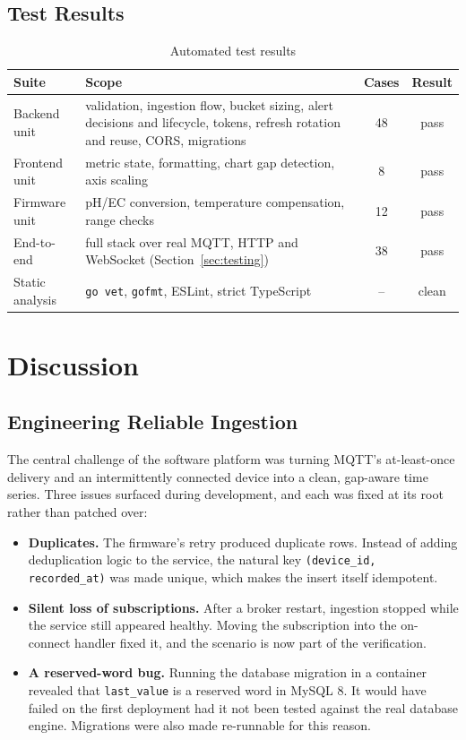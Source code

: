 \documentclass[11pt,a4paper,oneside]{report}
\newcommand{\code}[1]{\texttt{#1}}
\begin{document}
\section{Test Results}
\begin{table}[htbp]
\centering
\caption{Automated test results}
\label{tab:tests}
\small
\begin{tabularx}{\linewidth}{@{}l X c c@{}}
\toprule
\textbf{Suite} & \textbf{Scope} & \textbf{Cases} & \textbf{Result} \\
\midrule
Backend unit       & validation, ingestion flow, bucket sizing, alert decisions and lifecycle, tokens, refresh rotation and reuse, CORS, migrations & 48 & pass \\
Frontend unit      & metric state, formatting, chart gap detection, axis scaling & 8 & pass \\
Firmware unit      & pH/EC conversion, temperature compensation, range checks & 12 & pass \\
End-to-end         & full stack over real MQTT, HTTP and WebSocket (Section~\ref{sec:testing}) & 38 & pass \\
Static analysis    & \code{go vet}, \code{gofmt}, ESLint, strict TypeScript & -- & clean \\
\bottomrule
\end{tabularx}
\end{table}

\chapter{Discussion}

\section{Engineering Reliable Ingestion}
The central challenge of the software platform was turning MQTT's at-least-once
delivery and an intermittently connected device into a clean, gap-aware time series.
Three issues surfaced during development, and each was fixed at its root rather than
patched over:
\begin{itemize}
  \item \textbf{Duplicates.} The firmware's retry produced duplicate rows. Instead of
        adding deduplication logic to the service, the natural key
        \code{(device\_id, recorded\_at)} was made unique, which makes the insert itself
        idempotent.
  \item \textbf{Silent loss of subscriptions.} After a broker restart, ingestion
        stopped while the service still appeared healthy. Moving the subscription into
        the on-connect handler fixed it, and the scenario is now part of the
        verification.
  \item \textbf{A reserved-word bug.} Running the database migration in a container
        revealed that \code{last\_value} is a reserved word in MySQL 8. It would have
        failed on the first deployment had it not been tested against the real database
        engine. Migrations were also made re-runnable for this reason.
\end{itemize}
\end{document}

